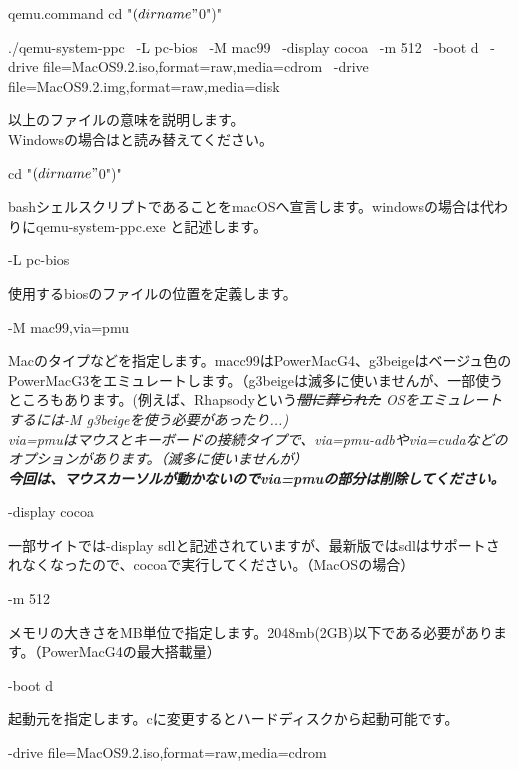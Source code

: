 \documentclass[b5paper,10pt]{jsarticle}
\begin{document}
\begin{multicols*}{3}
\begin{lstlistng}[saitama]
\begin{itembox}{qemu.command}
cd "$(dirname "$0")"

./qemu-system-ppc \
-L pc-bios \
-M mac99 \
-display cocoa \
-m 512 \
-boot d \
-drive file=MacOS9.2.iso,format=raw,media=cdrom \
-drive file=MacOS9.2.img,format=raw,media=disk 
\end{itembox}
以上のファイルの意味を説明します。\\
Windowsの場合はと読み替えてください。\\
\begin{itembox}
cd "$(dirname "$0")"\\
\end{itembox}
bashシェルスクリプトであることをmacOSへ宣言します。windowsの場合は代わりにqemu-system-ppc.exe と記述します。\\
\begin{itembox}
 -L pc-bios
\end{itembox}
使用するbiosのファイルの位置を定義します。\\
\begin{itembox}
 -M mac99,via=pmu 
\end{itembox}
Macのタイプなどを指定します。macc99はPowerMacG4、g3beigeはベージュ色のPowerMacG3をエミュレートします。（g3beigeは滅多に使いませんが、一部使うところもあります。(例えば、Rhapsodyという\it  \sout{闇に葬られた} \sc OSをエミュレートするには-M g3beigeを使う必要があったり...)\\
via=pmuはマウスとキーボードの接続タイプで、via=pmu-adbやvia=cudaなどのオプションがあります。（滅多に使いませんが）\\
\textbf{今回は、マウスカーソルが動かないのでvia=pmuの部分は削除してください。}\\
\begin{itembox}
 -display cocoa 
\end{itembox}
一部サイトでは-display sdlと記述されていますが、最新版ではsdlはサポートされなくなったので、cocoaで実行してください。（MacOSの場合）\\
\begin{itembox}
 -m 512 
\end{itembox}
メモリの大きさをMB単位で指定します。2048mb(2GB)以下である必要があります。（PowerMacG4の最大搭載量）\\
\begin{itembox}
 -boot d
\end{itembox}
起動元を指定します。cに変更するとハードディスクから起動可能です。\\
\begin{itembox}
 -drive file=MacOS9.2.iso,format=raw,media=cdrom \ \\

\end{itembox}
\end{lstlistng}
\end{multicols*}
\end{document}
